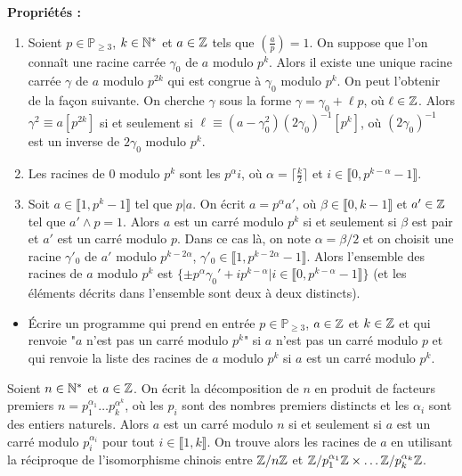 \documentclass[11pt,a4paper]{article}
\begin{document}
\textbf{Propriétés :}\begin{enumerate}
\item Soient  $p\in \mathbb{P}_{\geq 3}$, $k\in \mathbb{N}^*$ et $a\in \mathbb{Z}$ tels que $\left(\frac{a}{p}\right)=1$. On suppose que l'on connaît une racine carrée $\gamma_0$ de $a$ modulo $p^k$. Alors il existe une unique racine carrée $\gamma$ de $a$ modulo $p^{2k}$ qui est congrue à $\gamma_0$ modulo $p^k$. On peut l'obtenir de la façon suivante. On cherche $\gamma$ sous la forme $\gamma=\gamma_0+\ell p$, où $\ell\in \mathbb{Z}$. Alors $\gamma^2\equiv a[p^{2k}]$ si et seulement si $\ell \equiv (a-\gamma_0^2) (2\gamma_0)^{-1}[p^k]$, où $(2\gamma_0)^{-1}$ est un inverse de $2\gamma_0$ modulo $p^k$. 

\item Les racines de $0$ modulo $p^k$ sont les $p^\alpha i$, où $\alpha=\lceil \frac{k}{2}\rceil$ et $i\in \llbracket 0, p^{k-\alpha}-1\rrbracket$. 

\item Soit $a\in \llbracket 1,p^{k}-1\rrbracket$  tel que $p|a$. On écrit $a=p^{\alpha} a'$, où $\beta\in \llbracket 0,k-1\rrbracket$ et $a'\in \mathbb{Z}$ tel que $a'\wedge p=1$. Alors $a$ est un carré modulo $p^k$ si et seulement si $\beta$ est pair et $a'$ est un carré modulo $p$. Dans ce cas là, on note $\alpha=\beta/2$ et on choisit une racine $\gamma'_0$ de $a'$ modulo $p^{k-2\alpha}$, $\gamma'_0\in \llbracket 1,p^{k-2\alpha}-1\rrbracket$. Alors l'ensemble des racines de $a$ modulo $p^k$ est $\{\pm p^\alpha \gamma_0'+ip^{k-\alpha}|i\in \llbracket 0,p^{k-\alpha}-1\rrbracket\}$ (et les éléments décrits dans l'ensemble sont deux à deux distincts).
\end{enumerate} 

\begin{itemize}
\item[•] Écrire un programme qui prend en entrée $p\in \mathbb{P}_{\geq 3}$, $a\in \mathbb{Z}$ et $k\in \mathbb{Z}$ et qui renvoie "$a$ n'est pas un carré modulo $p^k$" si $a$ n'est pas un carré modulo $p$ et qui renvoie la liste des racines de $a$ modulo $p^k$ si $a$ est un carré modulo $p^k$.
\end{itemize}


Soient $n\in \mathbb{N}^*$ et $a\in \mathbb{Z}$. On écrit la décomposition de $n$ en produit de facteurs premiers $n=p_1^{\alpha_1}\ldots p_k^{\alpha^k}$, où les $p_i$ sont des nombres premiers distincts et les $\alpha_i$ sont des entiers naturels. Alors $a$ est un carré modulo $n$ si et seulement si $a$ est un carré modulo $p_i^{\alpha_i}$ pour tout $i\in \llbracket 1,k\rrbracket$. On trouve alors les racines de $a$ en utilisant la réciproque de l'isomorphisme chinois entre $\mathbb{Z}/n\mathbb{Z}$ et $\mathbb{Z}/p_1^{\alpha_1}\mathbb{Z}\times\ldots \mathbb{Z}/p_k^{\alpha_k}\mathbb{Z}$.
\end{document}
